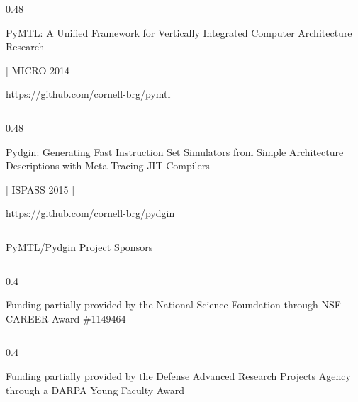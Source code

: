 \begin{frame}

\vspace{0.5in}
\begin{cbxcols}

  \begin{column}{0.48\tw}
    \centering

    \vspace{0.215in}

    PyMTL: A Unified Framework for Vertically Integrated Computer
    Architecture Research

    \vspace{0.39in}
    [ MICRO 2014 ]

    \vspace{0.05in}
    \small{https://github.com/cornell-brg/pymtl}
  \end{column}

  \begin{column}{0.48\tw}
    \centering


    \vspace{0.25in}

    Pydgin: Generating Fast Instruction Set Simulators from Simple
    Architecture Descriptions with Meta-Tracing JIT Compilers

    \vspace{0.2in}
    [ ISPASS 2015 ]

    \vspace{0.05in}
    \small{https://github.com/cornell-brg/pydgin}

  \end{column}
\end{cbxcols}
\end{frame}

\begin{frame}{PyMTL/Pydgin Project Sponsors}
\begin{cbxcols}
  \begin{column}{0.4\tw}

    \vspace{0.1in}\centering

    Funding partially provided by the National Science Foundation through
    NSF CAREER Award \#1149464

  \end{column}

  \begin{column}{0.4\tw}
    \vspace{0.18in}

    \vspace{0.15in}\centering

    Funding partially provided by the Defense Advanced Research Projects
    Agency through a DARPA Young Faculty Award

  \end{column}

\end{cbxcols}
\end{frame}

